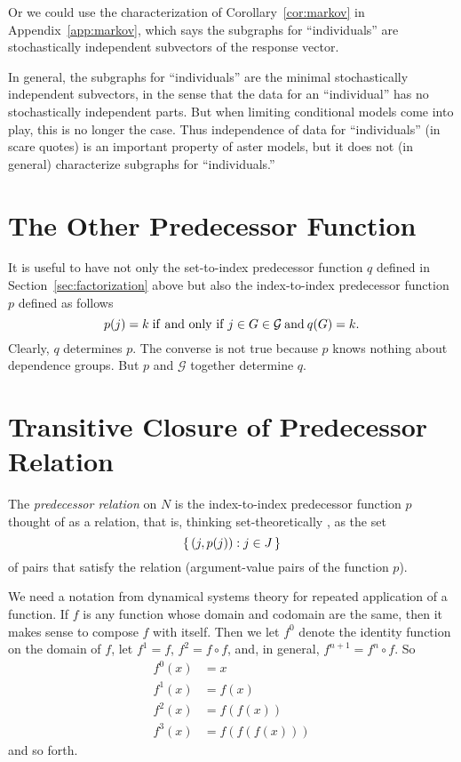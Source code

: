 Or we could use the characterization of Corollary~\ref{cor:markov} in
Appendix~\ref{app:markov}, which says the subgraphs for ``individuals''
are stochastically independent subvectors of the response vector.

In general, the subgraphs for ``individuals'' are the minimal stochastically
independent subvectors, in the sense that the data for an ``individual'' has
no stochastically independent parts.  But when limiting conditional models
come into play, this is no longer the case.
Thus independence of data for ``individuals'' (in scare quotes)
is an important property of
aster models, but it does not (in general) characterize
subgraphs for ``individuals.''

\section{The Other Predecessor Function}
\label{sec:other}

It is useful to have not only the set-to-index predecessor function $q$
defined in Section~\ref{sec:factorization} above but also the index-to-index
predecessor function $p$ defined as follows
$$
   p(j) = k \mathrel{\rm if\ and\ only\ if} j \in G \in \mathcal{G} \mathbin{\rm and} q(G) = k.
$$
Clearly, $q$ determines $p$.
The converse is not true because $p$ knows nothing about dependence groups.
But $p$ and $\mathcal{G}$ together determine $q$.

\section{Transitive Closure of Predecessor Relation}
\label{sec:closure}

The \emph{predecessor relation} on $N$ is the index-to-index predecessor
function $p$ thought
of as a relation, that is, thinking set-theoretically
\citep[Section~7]{halmos-set-theory}, as the set
\begin{equation} \label{eq:predecessor-relation}
   \{\,  (j, p(j)) : j \in J  \,\}
\end{equation}
of pairs that satisfy the relation (argument-value pairs of the function $p$).

We need a notation from dynamical systems theory for repeated application
of a function.  If $f$ is any function whose domain and codomain are the same,
then it makes sense to compose $f$ with itself.  Then we let $f^0$ denote
the identity function on the domain of $f$, let $f^1 = f$, $f^2 = f \circ f$,
and, in general, $f^{n + 1} = f^n \circ f$.
So
\begin{align*}
   f^0(x) & = x
   \\
   f^1(x) & = f(x)
   \\
   f^2(x) & = f(f(x))
   \\
   f^3(x) & = f(f(f(x)))
\end{align*}
and so forth.

